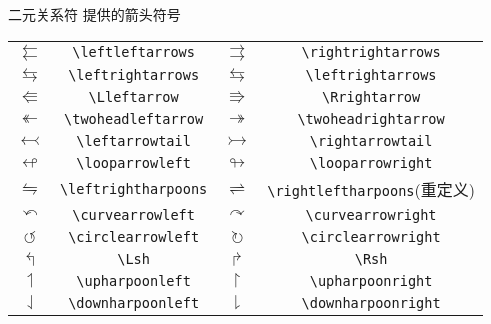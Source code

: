 \documentclass[mathserif]{beamer}
\begin{document}
\begin{frame}[fragile]{二元关系符}{\AmS{} 提供的箭头符号}
\begin{table}[H]
\centering
\begin{tabular}{cc|cc}
	\toprule
	$\leftleftarrows$ & \lstinline'\leftleftarrows' & $\rightrightarrows$ & \lstinline'\rightrightarrows' \\
	$\leftrightarrows$ & \lstinline'\leftrightarrows' & $\leftrightarrows$ & \lstinline'\leftrightarrows' \\
	$\Lleftarrow$ & \lstinline'\Lleftarrow' & $\Rrightarrow$ & \lstinline'\Rrightarrow' \\
	$\twoheadleftarrow$ & \lstinline'\twoheadleftarrow' & $\twoheadrightarrow$ & \lstinline'\twoheadrightarrow' \\
	$\leftarrowtail$ & \lstinline'\leftarrowtail' & $\rightarrowtail$ & \lstinline'\rightarrowtail' \\
	$\looparrowleft$ & \lstinline'\looparrowleft' & $\looparrowright$ & \lstinline'\looparrowright' \\
	$\leftrightharpoons$ & \lstinline'\leftrightharpoons' & $\rightleftharpoons$ & \lstinline'\rightleftharpoons'(重定义) \\
	$\curvearrowleft$ & \lstinline'\curvearrowleft' & $\curvearrowright$ & \lstinline'\curvearrowright' \\
	$\circlearrowleft$ & \lstinline'\circlearrowleft' & $\circlearrowright$ & \lstinline'\circlearrowright' \\
	$\Lsh$ & \lstinline'\Lsh' & $\Rsh$ & \lstinline'\Rsh' \\
	$\upharpoonleft$ & \lstinline'\upharpoonleft' & $\upharpoonright$ & \lstinline'\upharpoonright' \\
	$\downharpoonleft$ & \lstinline'\downharpoonleft' & $\downharpoonright$ & \lstinline'\downharpoonright' \\
	\bottomrule
\end{tabular}
\end{table}
\end{frame}
\end{document}
